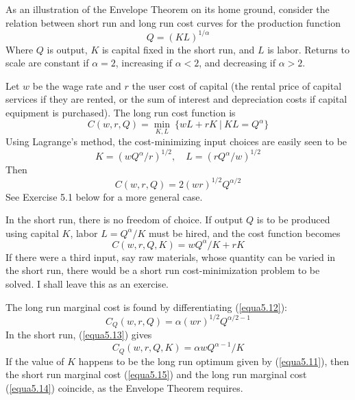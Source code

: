 As an illustration of the Envelope Theorem on its home ground, consider the relation between short run and long run cost curves for the production function
\begin{equation} \label{equa5.9}
   Q = (K L)^{1/\alpha}
\end{equation}
Where $Q$ is output, $K$ is capital fixed in the short run, and $L$ is labor. Returns to scale are constant if $\alpha=2$, increasing if $\alpha <2$, and decreasing if $\alpha >2$.

Let $w$ be the wage rate and $r$ the user cost of capital (the rental price of capital services if they are rented, or the sum of interest and depreciation costs if capital equipment is purchased). The long run cost function is
\begin{equation} \label{equa5.10}
    C(w,r,Q) = \min\limits_{K,L}\ \{ wL + rK \ | \  KL=Q^\alpha     \}
\end{equation}
Using Lagrange's method, the cost-minimizing input choices are easily seen to be
\begin{equation} \label{equa5.11}
    K = (wQ^\alpha / r)^{1/2}, \quad L = (rQ^\alpha/w)^{1/2}
\end{equation}
Then
\begin{equation} \label{equa5.12}
    C(w,r,Q) = 2(wr)^{1/2}  Q^{\alpha/2}
\end{equation}
See Exercise 5.1 below for a more general case.

In the short run, there is no freedom of choice. If output $Q$ is to be produced using capital $K$, labor $L=Q^\alpha / K$ must be hired, and the cost function becomes
\begin{equation} \label{equa5.13}
    C(w,r,Q,K) = w Q^\alpha / K + rK
\end{equation}
If there were a third input, say raw materials, whose quantity can be varied in the short run, there would be a short run cost-minimization problem to be solved. I shall leave this as an exercise.

The long run marginal cost is found by differentiating (\ref{equa5.12}):
\begin{equation} \label{equa5.14}
    C_Q(w,r,Q) = \alpha (wr)^{1/2} Q^{\alpha/2 -1}
\end{equation}
In the short run, (\ref{equa5.13}) gives
\begin{equation} \label{equa5.15}
    C_Q(w,r,Q,K) = \alpha w Q^{\alpha-1} / K
\end{equation}
If the value of $K$ happens to be the long run optimum given by (\ref{equa5.11}), then the short run marginal cost (\ref{equa5.15}) and the long run marginal cost (\ref{equa5.14}) coincide, as the Envelope Theorem requires.

